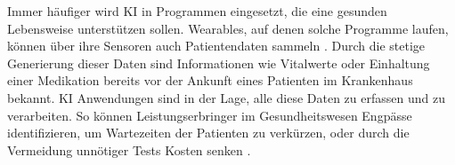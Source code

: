 Immer häufiger wird KI in Programmen eingesetzt, die eine gesunden Lebensweise unterstützen sollen. Wearables, auf denen solche Programme laufen, können über ihre Sensoren auch Patientendaten sammeln \cite{Opportunities_challenges_ai_hc}.  Durch die stetige Generierung dieser Daten sind Informationen wie Vitalwerte oder Einhaltung einer Medikation bereits vor der Ankunft eines Patienten im Krankenhaus bekannt. KI Anwendungen sind in der Lage, alle diese Daten zu erfassen und zu verarbeiten. So können Leistungserbringer im Gesundheitswesen Engpässe identifizieren, um Wartezeiten der Patienten zu verkürzen, oder durch die Vermeidung unnötiger Tests Kosten senken \cite{Chapter_14}.\\


 